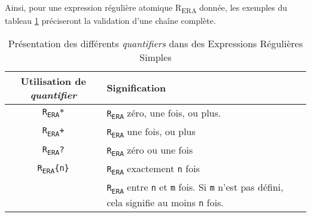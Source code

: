 Ainsi, pour une expression régulière atomique R\textsubscript{ERA} donnée, les exemples du tableau \ref{tab:ERS} préciseront la validation d'une chaîne complète.
\begin{table}[h!]
    \centering
    \begin{tabularx}{\textwidth}{| c | X |}
        \hline
        \textbf{Utilisation de \textit{quantifier}} & \textbf{Signification}                                                \\
            \hline
        \texttt{R\textsubscript{ERA}*}      &   \texttt{R\textsubscript{ERA}} zéro, une fois, ou plus.                      \\
            \hline
        \texttt{R\textsubscript{ERA}+}      &   \texttt{R\textsubscript{ERA}} une fois, ou plus                             \\
            \hline
        \texttt{R\textsubscript{ERA}?}      &   \texttt{R\textsubscript{ERA}} zéro ou une fois                              \\
            \hline
        \texttt{R\textsubscript{ERA}\{n\}}  &   \texttt{R\textsubscript{ERA}} exactement \texttt{n} fois                    \\
            \hline
        \raisebox{-\height}{\texttt{R\textsubscript{ERA}\{n,m\}}} &   \texttt{R\textsubscript{ERA}} entre \texttt{n} et \texttt{m} fois. \newline
                                                Si \texttt{m} n'est pas défini, cela signifie au moins \texttt{n} fois.     \\
        \hline
    \end{tabularx}
    \caption{Présentation des différents \textit{quantifiers} dans des Expressions Régulières Simples}\label{tab:ERS}
\end{table}
\vspace{-1cm}

